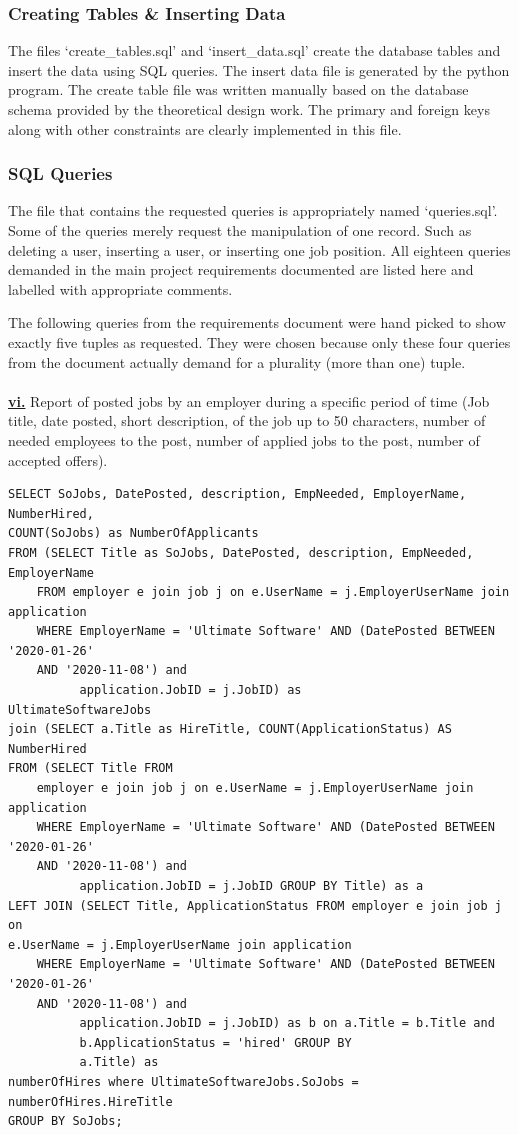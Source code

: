 \documentclass[11pt]{article}
\begin{document}
\subsubsection{Creating Tables \& Inserting Data}

The files `create\_tables.sql' and `insert\_data.sql' create the database tables and insert the data using SQL queries. The insert data file is generated by the python program. The create table file was written manually based on the database schema provided by the theoretical design work. The primary and foreign keys along with other constraints are clearly implemented in this file.

\subsubsection{SQL Queries}

The file that contains the requested queries is appropriately named `queries.sql'. Some of the queries merely request the manipulation of one record. Such as deleting a user, inserting a user, or inserting one job position. All eighteen queries demanded in the main project requirements documented are listed here and labelled with appropriate comments. \par 
The following queries from the requirements document were hand picked to show exactly five tuples as requested. They were chosen because only these four queries from the document actually demand for a plurality (more than one) tuple. \\
\\
\underline{\textbf{vi.}} Report of posted jobs by an employer during a specific period of time (Job title, date posted, short description, of the job up to 50 characters, number of needed employees to the post, number of applied jobs to the post, number of accepted offers). \\

\begin{verbatim}
SELECT SoJobs, DatePosted, description, EmpNeeded, EmployerName, NumberHired, 
COUNT(SoJobs) as NumberOfApplicants
FROM (SELECT Title as SoJobs, DatePosted, description, EmpNeeded, EmployerName
    FROM employer e join job j on e.UserName = j.EmployerUserName join application
    WHERE EmployerName = 'Ultimate Software' AND (DatePosted BETWEEN '2020-01-26' 
    AND '2020-11-08') and
          application.JobID = j.JobID) as
UltimateSoftwareJobs
join (SELECT a.Title as HireTitle, COUNT(ApplicationStatus) AS NumberHired
FROM (SELECT Title FROM
    employer e join job j on e.UserName = j.EmployerUserName join application
    WHERE EmployerName = 'Ultimate Software' AND (DatePosted BETWEEN '2020-01-26' 
    AND '2020-11-08') and
          application.JobID = j.JobID GROUP BY Title) as a
LEFT JOIN (SELECT Title, ApplicationStatus FROM employer e join job j on 
e.UserName = j.EmployerUserName join application
    WHERE EmployerName = 'Ultimate Software' AND (DatePosted BETWEEN '2020-01-26'
    AND '2020-11-08') and
          application.JobID = j.JobID) as b on a.Title = b.Title and 
          b.ApplicationStatus = 'hired' GROUP BY
          a.Title) as
numberOfHires where UltimateSoftwareJobs.SoJobs = numberOfHires.HireTitle
GROUP BY SoJobs;
\end{verbatim}
\end{document}
